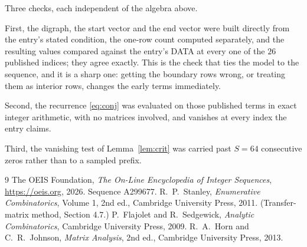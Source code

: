 \documentclass[11pt,a4paper]{article}
\theoremstyle{plain}
\theoremstyle{definition}
\begin{document}
Three checks, each independent of the algebra above.

First, the digraph, the start vector and the end vector were built directly from the
entry's stated condition, the one-row count computed separately, and the resulting values
compared against the entry's DATA at every one of the $26$ published indices; they
agree exactly. This is the check that ties the model to the sequence, and it is a sharp one:
getting the boundary rows wrong, or treating them as interior rows, changes the early terms
immediately.

Second, the recurrence \eqref{eq:conj} was evaluated on those published terms in exact
integer arithmetic, with no matrices involved, and vanishes at every index the entry claims.

Third, the vanishing test of Lemma~\ref{lem:crit} was carried past $S=64$ consecutive
zeros rather than to a sampled prefix.

\begin{thebibliography}{9}
 The OEIS Foundation, \emph{The On-Line Encyclopedia of Integer
Sequences}, \url{https://oeis.org}, 2026. Sequence A299677.
 R.~P.~Stanley, \emph{Enumerative Combinatorics}, Volume 1, 2nd ed.,
Cambridge University Press, 2011. (Transfer-matrix method, Section 4.7.)
 P.~Flajolet and R.~Sedgewick, \emph{Analytic Combinatorics}, Cambridge
University Press, 2009.
 R.~A.~Horn and C.~R.~Johnson, \emph{Matrix Analysis}, 2nd ed., Cambridge
University Press, 2013.
\end{thebibliography}
\end{document}
